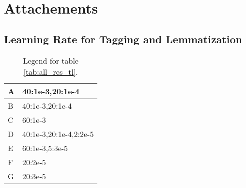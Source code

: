 \chapter{Attachements}
\section{Learning Rate for Tagging and Lemmatization}
\label{att:1}
\begin{table}[!h]
\cetnering
\begin{tabular}{|l|l|}
\hline
A & 40:1e-3,20:1e-4        \\ \hline
B & 40:1e-3,20:1e-4        \\ \hline
C & 60:1e-3                \\ \hline
D & 40:1e-3,20:1e-4,2:2e-5 \\ \hline
E & 60:1e-3,5:3e-5         \\ \hline
F & 20:2e-5                \\ \hline
G & 20:3e-5                \\ \hline
\end{tabular}
\caption{Legend for table \ref{tab:all_res_tl}. }
\end{table}
